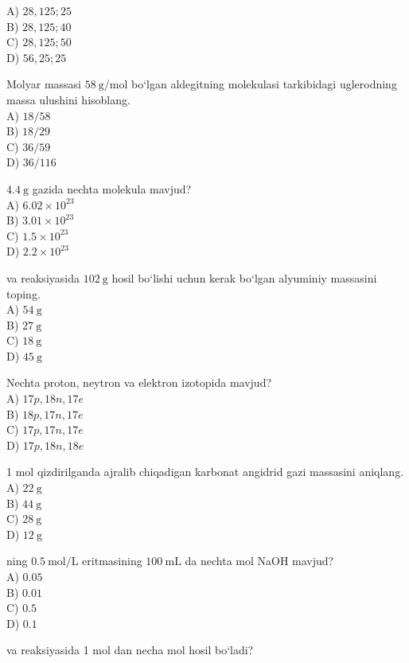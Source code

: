A) $28{,}125 ; 25$\\
B) $28{,}125 ; 40$\\
C) $28{,}125 ; 50$\\
D) $56{,}25 ; 25$
\item Molyar massasi $58~\mathrm{g/mol}$ bo‘lgan aldegitning molekulasi tarkibidagi uglerodning massa ulushini hisoblang.\\
A) $18 / 58$\\
B) $18 / 29$\\
C) $36 / 59$\\
D) $36 / 116$
\item $4.4~\mathrm{g}$  gazida nechta molekula mavjud?\\
A) $6.02 \times 10^{23}$\\
B) $3.01 \times 10^{23}$\\
C) $1.5 \times 10^{23}$\\
D) $2.2 \times 10^{23}$
\item {} va  reaksiyasida $102~\mathrm{g}$  hosil bo‘lishi uchun kerak bo‘lgan alyuminiy massasini toping.\\
A) $54~\mathrm{g}$\\
B) $27~\mathrm{g}$\\
C) $18~\mathrm{g}$\\
D) $45~\mathrm{g}$
\item Nechta proton, neytron va elektron  izotopida mavjud?\\
A) $17p, 18n, 17e$\\
B) $18p, 17n, 17e$\\
C) $17p, 17n, 17e$\\
D) $17p, 18n, 18e$
\item 1 mol  qizdirilganda ajralib chiqadigan karbonat angidrid gazi massasini aniqlang.\\
A) $22~\mathrm{g}$\\
B) $44~\mathrm{g}$\\
C) $28~\mathrm{g}$\\
D) $12~\mathrm{g}$
\item {} ning $0.5~\mathrm{mol/L}$ eritmasining $100~\mathrm{mL}$ da nechta mol NaOH mavjud?\\
A) $0.05$\\
B) $0.01$\\
C) $0.5$\\
D) $0.1$
\item {} va  reaksiyasida 1 mol  dan necha mol  hosil bo‘ladi?\\
